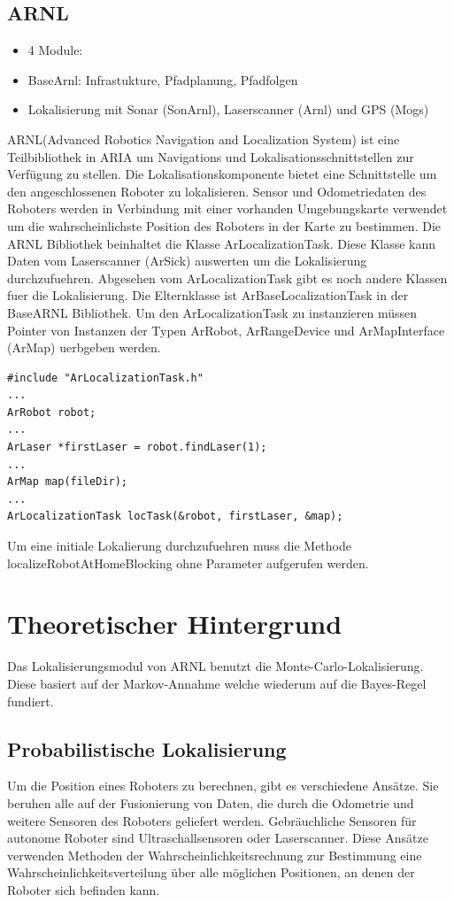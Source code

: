 \documentclass{article}
\begin{document}
\subsection{ARNL}
\begin{itemize}
\item 4 Module:
\item BaseArnl: Infrastukture, Pfadplanung, Pfadfolgen
\item Lokalisierung mit Sonar (SonArnl), Laserscanner (Arnl) und GPS (Mogs)
\end{itemize}
ARNL(Advanced Robotics Navigation and Localization System) ist eine Teilbibliothek in ARIA um Navigations und Lokalisationsschnittstellen zur Verf\"ugung zu stellen. Die Lokalisationskomponente bietet eine Schnittstelle um den angeschlossenen Roboter zu lokalisieren. Sensor und Odometriedaten des Roboters werden in Verbindung mit einer vorhanden Umgebungskarte verwendet um die wahrscheinlichste Position des Roboters in der Karte zu bestimmen. \cite{arnl} 
Die ARNL Bibliothek beinhaltet die Klasse ArLocalizationTask. Diese Klasse kann Daten vom Laserscanner (ArSick) auswerten um die Lokalisierung durchzufuehren. Abgesehen vom ArLocalizationTask gibt es noch andere Klassen fuer die Lokalisierung. Die Elternklasse ist ArBaseLocalizationTask in der BaseARNL Bibliothek. \cite{arnl}
Um den ArLocalizationTask zu instanzieren m\"ussen Pointer von Instanzen der Typen ArRobot, ArRangeDevice und ArMapInterface (ArMap) uerbgeben werden.
\lstset{language=C++}
\begin{lstlisting}
#include "ArLocalizationTask.h"
...
ArRobot robot;
...
ArLaser *firstLaser = robot.findLaser(1);
...
ArMap map(fileDir);
...
ArLocalizationTask locTask(&robot, firstLaser, &map);
\end{lstlisting}
Um eine initiale Lokalierung durchzufuehren muss die Methode localizeRobotAtHomeBlocking ohne Parameter aufgerufen werden.






\section{Theoretischer Hintergrund}
Das Lokalisierungsmodul von ARNL benutzt die Monte-Carlo-Lokalisierung. Diese basiert auf der Markov-Annahme welche wiederum auf die Bayes-Regel fundiert.




\subsection{Probabilistische Lokalisierung}
Um die Position eines Roboters zu berechnen, gibt es verschiedene Ansätze. Sie beruhen alle auf der Fusionierung von Daten, die durch die Odometrie und weitere Sensoren des Roboters geliefert werden. Gebräuchliche Sensoren für autonome Roboter sind Ultraschallsensoren oder Laserscanner.
Diese Ansätze verwenden Methoden der Wahrscheinlichkeitsrechnung zur Bestimmung eine Wahrscheinlichkeitsverteilung über alle möglichen Positionen, an denen der Roboter sich befinden kann.
\end{document}
